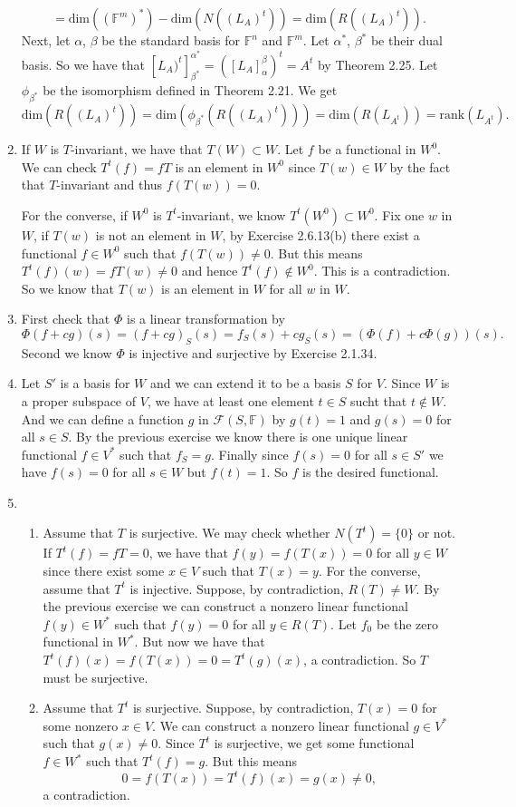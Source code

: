 \begin{enumerate}
\[=\mathrm{dim}((\mathbb{F}^m)^*)-\mathrm{dim}(N((L_A)^t))=\mathrm{dim}(R((L_A)^t)).\]
Next, let $\alpha $, $\beta $ be the standard basis for $\mathbb{F}^n$ and $\mathbb{F}^m$. Let $\alpha^* $, $\beta^* $ be their dual basis. So we have that $[L_A)^t]_{\beta^*}^{\alpha^*}=([L_A]_{\alpha}^{\beta})^t=A^t$ by Theorem 2.25. Let $\phi_{\beta^*}$ be the isomorphism defined in Theorem 2.21. We get 
\[\mathrm{dim}(R((L_A)^t))=\mathrm{dim}(\phi_{\beta^*}(R((L_A)^t)))=\mathrm{dim}(R(L_{A^t}))=\mathrm{rank}(L_{A^t}).\]
\item If $W$ is $T$-invariant, we have that $T(W)\subset W$. Let $f$ be a functional in $W^0$. We can check $T^t(f)=fT$ is an element in $W^0$ since $T(w)\in W$ by the fact that $T$-invariant and thus $f(T(w))=0$.

For the converse, if $W^0$ is $T^t$-invariant, we know $T^t(W^0)\subset W^0$. Fix one $w$ in $W$, if $T(w)$ is not an element in $W$, by Exercise 2.6.13(b) there exist a functional $f\in W^0$ such that $f(T(w))\neq 0$. But this means $T^t(f)(w)=fT(w)\neq 0$ and hence $T^t(f)\notin W^0$. This is a contradiction. So we know that $T(w)$ is an element in $W$ for all $w$ in $W$.
\item First check that $\Phi $ is a linear transformation by 
\[\Phi(f+cg)(s)=(f+cg)_S(s)=f_S(s)+cg_S(s)=(\Phi(f)+c\Phi(g))(s).\]
Second we know $\Phi $ is injective and surjective by Exercise 2.1.34.
\item Let $S'$ is a basis for $W$ and we can extend it to be a basis $S$ for $V$. Since $W$ is a proper subspace of $V$, we have at least one element $t\in S$ sucht that $t\notin W$. And we can define a function $g$ in $\mathcal{F}(S,\mathbb{F})$ by $g(t)=1$ and $g(s)=0$ for all $s\in S$. By the previous exercise we know there is one unique linear functional $f\in V^*$ such that $f_S=g$. Finally since $f(s)=0$ for all $s\in S'$ we have $f(s)=0$ for all $s\in W$ but $f(t)=1$. So $f$ is the desired functional.
\item \begin{enumerate}
\item Assume that $T$ is surjective. We may check whether $N(T^t)=\{0\}$ or not. If $T^t(f)=fT=0$, we have that $f(y)=f(T(x))=0$ for all $y\in W$ since there exist some $x\in V$ such that $T(x)=y$. For the converse, assume that $T^t$ is injective. Suppose, by contradiction, $R(T)\neq W$. By the previous exercise we can construct a nonzero linear functional $f(y)\in W^*$ such that $f(y)=0$ for all $y\in R(T)$. Let $f_0$ be the zero functional in $W^*$. But now we have that $T^t(f)(x)=f(T(x))=0=T^t(g)(x)$, a contradiction. So $T$ must be surjective.
\item Assume that $T^t$ is surjective. Suppose, by contradiction, $T(x)=0$ for some nonzero $x\in V$. We can construct a nonzero linear functional $g\in V^*$ such that $g(x)\neq 0$. Since $T^t$ is surjective, we get some functional $f\in W^*$ such that $T^t(f)=g$. But this means 
\[0=f(T(x))=T^t(f)(x)=g(x)\neq 0,\]
a contradiction.


\end{enumerate}
\end{enumerate}
